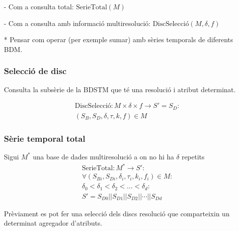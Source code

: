   - Com a consulta total: $\text{SerieTotal}(M)$

  - Com a consulta amb informació multiresolució: $\text{DiscSelecció}(M,\delta,f)$

* Pensar com operar (per exemple sumar) amb sèries temporals de diferents BDM. 




\subsubsection{Selecció de disc}


Consulta la subsèrie de la BDSTM que té una resolució i atribut
determinat. 


\begin{definition}[DiscSelecció]
  \begin{gather*}
    \text{DiscSelecció}: M \times \delta \times f \longrightarrow S' = S_D: \\
    (S_B,S_D,\delta,\tau,k,f) \in M
\end{gather*}
\end{definition}



\subsubsection{Sèrie temporal total}



\begin{definition}
  Sigui $M^*$ una base de dades multiresolució a on no hi ha $\delta$ repetits
  \begin{gather*}
    \text{SerieTotal}: M^* \longrightarrow S': \\
    \forall (S_{Bi},S_{Di},\delta_i,\tau_i,k_i,f_i) \in M : \\
    \delta_0 < \delta_1 < \delta_2 < \dots < \delta_d : \\
    S' = S_{D0} || S_{D1} || S_{D2} || \dotsb || S_{Dd}
\end{gather*}
\end{definition}

Prèviament es pot fer una selecció dels discs resolució que
comparteixin un determinat agregador d'atributs. 



